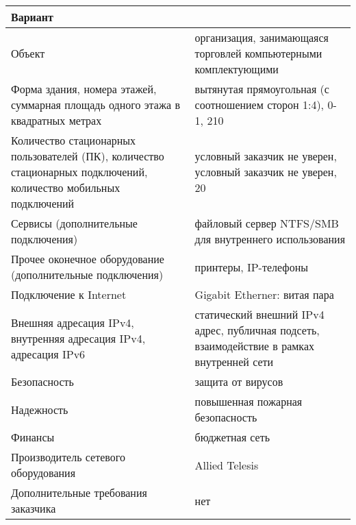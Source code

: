 \begin{table}[htbp]
  \begin{tabular}{| >{\raggedright}p{}
                  | >{\raggedright\arraybackslash}p{}|}
    \hline
    Вариант &
    57
    \\ \hline

    Объект &
    организация, занимающаяся торговлей компьютерными комплектующими
    \\ \hline

    Форма здания, номера этажей, суммарная площадь одного этажа в квадратных метрах &
    вытянутая прямоугольная (с соотношением сторон 1:4), 0-1, 210
    \\ \hline

    Количество стационарных пользователей (ПК), количество стационарных подключений, количество мобильных подключений &
    условный заказчик не уверен, условный заказчик не уверен, 20
    \\ \hline

    Сервисы (дополнительные подключения) &
    файловый сервер NTFS/SMB для внутреннего использования
    \\ \hline

    Прочее оконечное оборудование (дополнительные подключения) &
    принтеры, IP-телефоны
    \\ \hline

    Подключение к Internet &
    Gigabit Etherner: витая пара
    \\ \hline

    Внешняя адресация IPv4, внутренняя адресация IPv4, адресация IPv6 &
    статический внешний IPv4 адрес, публичная подсеть, взаимодействие в рамках внутренней сети
    \\ \hline

    Безопасность &
    защита от вирусов
    \\ \hline

    Надежность &
    повышенная пожарная безопасность
    \\ \hline

    Финансы &
    бюджетная сеть
    \\ \hline

    Производитель сетевого оборудования &
    Allied Telesis
    \\ \hline

    Дополнительные требования заказчика &
    нет
    \\ \hline
  \end{tabular}\label{tab:tasktable}
\end{table}

